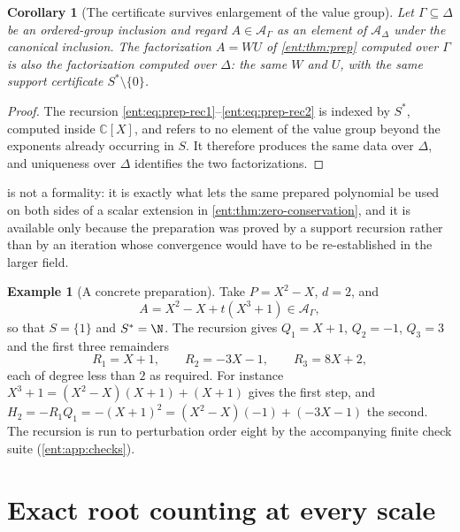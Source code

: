 \documentclass[11pt]{article}
\theoremstyle{plain}
\theoremstyle{plain}
\theoremstyle{plain}
\newtheorem{corollary}[corollary]{Corollary}
\theoremstyle{definition}
\theoremstyle{definition}
\theoremstyle{definition}
\newtheorem{example}[example]{Example}
\theoremstyle{definition}
\theoremstyle{remark}
\newcommand{\C}{\mathbb C}\newcommand{\R}{\mathbb R}
\newcommand{\A}{\mathcal A_\Gamma}\newcommand{\OO}{\mathcal O_\Gamma}
\begin{document}
\begin{corollary}[The certificate survives enlargement of the value group]
\label{ent:cor:prep-extension}
Let $\Gamma\subseteq\Delta$ be an ordered-group inclusion and regard
$A\in\A$ as an element of $\mathcal A_\Delta$ under the canonical inclusion.
The factorization $A=WU$ of \cref{ent:thm:prep} computed over $\Gamma$ is
also the factorization computed over $\Delta$: the same $W$ and $U$, with the
same support certificate $S^*\setminus\{0\}$.
\end{corollary}
\begin{proof}
The recursion \eqref{ent:eq:prep-rec1}--\eqref{ent:eq:prep-rec2} is indexed
by $S^*$, computed inside $\C[X]$, and refers to no element of the value
group beyond the exponents already occurring in $S$. It therefore produces
the same data over $\Delta$, and uniqueness over $\Delta$ identifies the two
factorizations.
\end{proof}

 is not a formality: it is exactly what lets the
same prepared polynomial be used on both sides of a scalar extension in
\cref{ent:thm:zero-conservation}, and it is available only because the
preparation was proved by a support recursion rather than by an iteration
whose convergence would have to be re-established in the larger field.

\begin{example}[A concrete preparation]\label{ent:ex:cubic}
Take $P=X^2-X$, $d=2$, and
\begin{equation}\label{ent:eq:cubic}
 A=X^2-X+t(X^3+1)\in\A,
\end{equation}
so that $S=\{1\}$ and $S^*=\N$. The recursion gives $Q_1=X+1$, $Q_2=-1$,
$Q_3=3$ and the first three remainders
\[
 R_1=X+1,\qquad R_2=-3X-1,\qquad R_3=8X+2,
\]
each of degree less than $2$ as required. For instance
$X^3+1=(X^2-X)(X+1)+(X+1)$ gives the first step, and
$H_2=-R_1Q_1=-(X+1)^2=(X^2-X)(-1)+(-3X-1)$ the second. The recursion is run
to perturbation order eight by the accompanying finite check suite
(\cref{ent:app:checks}).
\end{example}

\section{Exact root counting at every scale}
\label{ent:sec:zeros}
\end{document}
